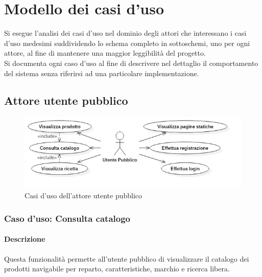 
\chapter{Modello dei casi d'uso}
\label{cap:modello-casi-d'uso}

Si esegue l'analisi dei casi d'uso nel dominio degli attori che interessano i casi d'uso medesimi suddividendo lo schema completo in sottoschemi, uno per ogni attore, al fine di mantenere una maggior leggibilità del progetto. \\
Si documenta ogni caso d'uso al fine di descrivere nel dettaglio il comportamento del sistema senza riferirsi ad una particolare implementazione.

\section{Attore utente pubblico}
%
%
\begin{figure}[h]
	\centering
	\includegraphics[width=1\textwidth]
	{immagini/attore-utente-pubblico}
	
	\caption{Casi d'uso dell'attore utente pubblico}
\end{figure}

%
%
\subsection{Caso d'uso: Consulta catalogo}

\subsubsection*{Descrizione}
Questa funzionalità permette all'utente pubblico di visualizzare il catalogo dei prodotti navigabile per reparto, caratteristiche, marchio e ricerca libera.

